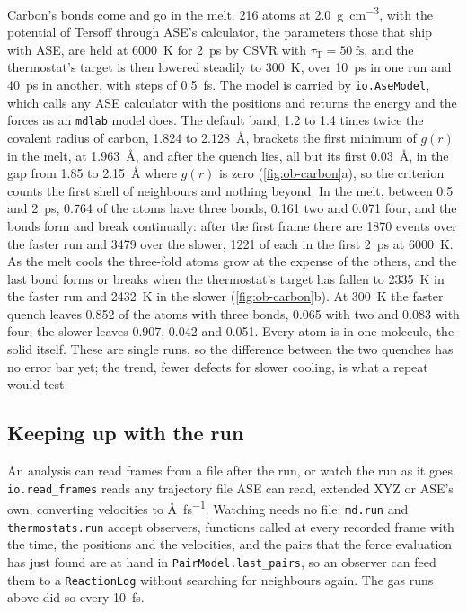 Carbon's bonds come and go in the melt. 216 atoms at
\SI{2.0}{\gram\per\centi\metre\cubed}, with the potential of
Tersoff\cite{Tersoff1989} through ASE's calculator, the parameters those
that ship with ASE, are held at \SI{6000}{\kelvin} for
\SI{2}{\pico\second} by CSVR with $\tau_{\mathrm T} = \SI{50}{\femto
\second}$, and the thermostat's target is then lowered steadily to
\SI{300}{\kelvin}, over \SI{10}{\pico\second} in one run and
\SI{40}{\pico\second} in another, with steps of \SI{0.5}{\femto\second}.
The model is carried by \texttt{io.AseModel}, which calls any ASE
calculator with the positions and returns the energy and the forces as an
\texttt{mdlab} model does. The default band, 1.2 to 1.4 times twice the
covalent radius of carbon, \num{1.824} to \SI{2.128}{\angstrom}, brackets
the first minimum of $g(r)$ in the melt, at \SI{1.963}{\angstrom}, and
after the quench lies, all but its first \SI{0.03}{\angstrom}, in the gap
from 1.85 to \SI{2.15}{\angstrom} where $g(r)$ is zero
(\cref{fig:ob-carbon}a), so the criterion counts the first shell of
neighbours and nothing beyond. In the melt, between 0.5 and
\SI{2}{\pico\second}, 0.764 of the atoms have three bonds, 0.161 two and
0.071 four, and the bonds form and break continually: after the first
frame there are 1870 events over the faster run and 3479 over the slower,
1221 of each in the first \SI{2}{\pico\second} at \SI{6000}{\kelvin}. As the melt cools the three-fold atoms grow at the expense of
the others, and the last bond forms or breaks when the thermostat's
target has fallen to \SI{2335}{\kelvin} in the faster run and
\SI{2432}{\kelvin} in the slower (\cref{fig:ob-carbon}b). At \SI{300}{\kelvin} the faster quench leaves
0.852 of the atoms with three bonds, 0.065 with two and 0.083 with four;
the slower leaves 0.907, 0.042 and 0.051. Every atom is in one molecule,
the solid itself. These are single runs, so the difference between the
two quenches has no error bar yet; the trend, fewer defects for slower
cooling, is what a repeat would test.

\subsection*{Keeping up with the run}

An analysis can read frames from a file after the run, or watch the run
as it goes. \texttt{io.read\_frames} reads any trajectory file ASE can
read, extended XYZ or ASE's own, converting velocities to
\si{\angstrom\per\femto\second}. Watching needs no file: \texttt{md.run}
and \texttt{thermostats.run} accept observers, functions called at every
recorded frame with the time, the positions and the velocities, and the
pairs that the force evaluation has just found are at hand in
\texttt{PairModel.last\_pairs}, so an observer can feed them to a
\texttt{ReactionLog} without searching for neighbours again. The gas runs
above did so every \SI{10}{\femto\second}.

